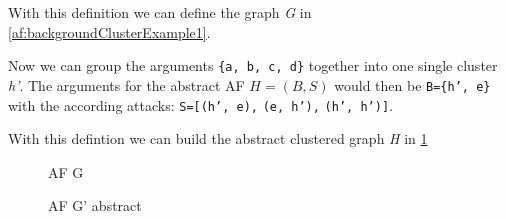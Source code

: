With this definition we can define the graph \textit{G} in \ref{af:backgroundClusterExample1}.

Now we can group the arguments \texttt{\{a, b, c, d\}} together into one single cluster \textit{h'}. The arguments for the abstract AF $H = (B, S)$ would then be \texttt{B=\{h', e\}} with the according attacks:
\texttt{S=[(h', e),}
\texttt{(e, h'),}
\texttt{(h', h')]}. 

With this defintion we can build the abstract clustered graph \textit{H} in \ref{af:backgroundClusterExample2}


\vspace{0.3cm}
\begin{figure}[h]
\begin{minipage}{.5\textwidth}
    \centering
    \caption{\ac{AF} G}
    \label{af:backgroundClusterExample1}
\end{minipage}%
\begin{minipage}{.5\textwidth}
    \centering
    \caption{\ac{AF} G' abstract}
    \label{af:backgroundClusterExample2}
\end{minipage}
\end{figure}

